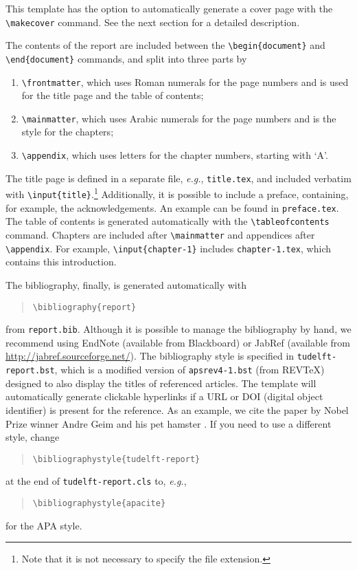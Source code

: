 This template has the option to automatically generate a cover page with the \texttt{\textbackslash makecover} command. See the next section for a detailed description.

The contents of the report are included between the \texttt{\textbackslash begin\{document\}} and \texttt{\textbackslash end\{document\}} commands, and split into three parts by
\begin{enumerate}
\item\texttt{\textbackslash frontmatter}, which uses Roman numerals for the page numbers and is used for the title page and the table of contents;
\item\texttt{\textbackslash mainmatter}, which uses Arabic numerals for the page numbers and is the style for the chapters;
\item\texttt{\textbackslash appendix}, which uses letters for the chapter numbers, starting with `A'.
\end{enumerate}
The title page is defined in a separate file, \emph{e.g.}, \texttt{title.tex}, and included verbatim with \texttt{\textbackslash input\{title\}}.\footnote{Note that it is not necessary to specify the file extension.} Additionally, it is possible to include a preface, containing, for example, the acknowledgements. An example can be found in \texttt{preface.tex}. The table of contents is generated automatically with the \texttt{\textbackslash tableofcontents} command. Chapters are included after \texttt{\textbackslash mainmatter} and appendices after \texttt{\textbackslash appendix}. For example, \texttt{\textbackslash input\{chapter-1\}} includes \texttt{chapter-1.tex}, which contains this introduction.

The bibliography, finally, is generated automatically with
\begin{quote}
    \texttt{\textbackslash bibliography\{report\}}
\end{quote}
from \texttt{report.bib}. Although it is possible to manage the bibliography by hand, we recommend using EndNote (available from Blackboard) or JabRef (available from \url{http://jabref.sourceforge.net/}). The bibliography style is specified in \texttt{tudelft-report.bst}, which is a modified version of \texttt{apsrev4-1.bst} (from REVTeX) designed to also display the titles of referenced articles. The template will automatically generate clickable hyperlinks if a URL or DOI (digital object identifier) is present for the reference. As an example, we cite the paper by Nobel Prize winner Andre Geim and his pet hamster \cite{Geim2001}. If you need to use a different style, change
\begin{quote}
    \texttt{\textbackslash bibliographystyle\{tudelft-report\}}
\end{quote}
at the end of \texttt{tudelft-report.cls} to, \emph{e.g.},
\begin{quote}
    \texttt{\textbackslash bibliographystyle\{apacite\}}
\end{quote}
for the APA style.

